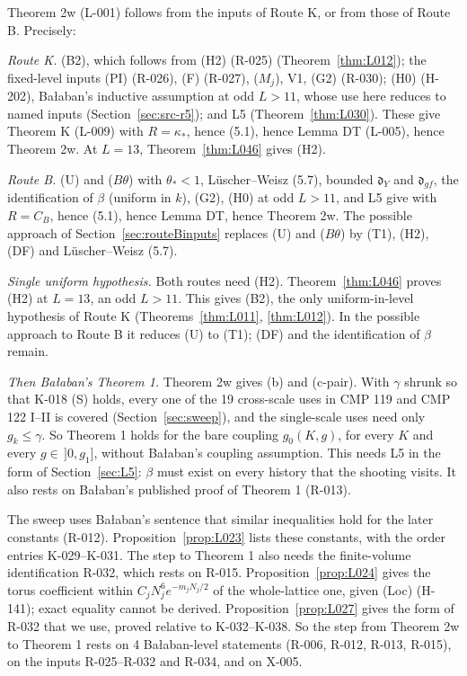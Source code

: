 Theorem 2w (L-001) follows from the inputs of Route K, or from those of Route B. Precisely:

\emph{Route K.} (B2), which follows from (H2) (R-025) (Theorem~\ref{thm:L012}); the fixed-level inputs (PI) (R-026), (F) (R-027), ($M_j$), V1, (G2) (R-030); (H0) (H-202), Ba{\l}aban's inductive assumption at odd $L>11$, whose use here reduces to named inputs (Section~\ref{sec:src-r5}); and L5 (Theorem~\ref{thm:L030}). These give Theorem K (L-009) with $R=\kappa_*$, hence (5.1), hence Lemma DT (L-005), hence Theorem 2w. At $L=13$, Theorem~\ref{thm:L046} gives (H2).

\emph{Route B.} (U) and ($B\theta$) with $\theta_*<1$, L\"uscher--Weisz (5.7), bounded $\mathfrak d_Y$ and $\mathfrak d_{gf}$, the identification of $\beta$ (uniform in $k$), (G2), (H0) at odd $L>11$, and L5 give \ThmPW{} with $R=C_B$, hence (5.1), hence Lemma DT, hence Theorem 2w. The possible approach of Section~\ref{sec:routeBinputs} replaces (U) and ($B\theta$) by (T1), (H2), (DF) and L\"uscher--Weisz (5.7).

\emph{Single uniform hypothesis.} Both routes need (H2). Theorem~\ref{thm:L046} proves (H2) at $L=13$, an odd $L>11$. This gives (B2), the only uniform-in-level hypothesis of Route K (Theorems~\ref{thm:L011}, \ref{thm:L012}). In the possible approach to Route B it reduces (U) to (T1); (DF) and the identification of $\beta$ remain.

\emph{Then Ba{\l}aban's Theorem 1.} Theorem 2w gives (b) and (c-pair). With $\gamma$ shrunk so that K-018 (S) holds, every one of the 19 cross-scale uses in CMP 119 and CMP 122 I--II is covered (Section~\ref{sec:sweep}), and the single-scale uses need only $g_k\le\gamma$. So Theorem 1 holds for the bare coupling $g_0(K,g)$, for every $K$ and every $g\in\,]0,g_1]$, without Ba{\l}aban's coupling assumption. This needs L5 in the form of Section~\ref{sec:L5}: $\beta$ must exist on every history that the shooting visits. It also rests on Ba{\l}aban's published proof of Theorem 1 (R-013).

The sweep uses Ba{\l}aban's sentence that similar inequalities hold for the later constants (R-012). Proposition~\ref{prop:L023} lists these constants, with the order entries K-029--K-031. The step to Theorem 1 also needs the finite-volume identification R-032, which rests on R-015. Proposition~\ref{prop:L024} gives the torus coefficient within $C_jN_j^6e^{-m_jN_j/2}$ of the whole-lattice one, given (Loc) (H-141); exact equality cannot be derived. Proposition~\ref{prop:L027} gives the form of R-032 that we use, proved relative to K-032--K-038. So the step from Theorem 2w to Theorem 1 rests on 4 Ba{\l}aban-level statements (R-006, R-012, R-013, R-015), on the inputs R-025--R-032 and R-034, and on X-005.


